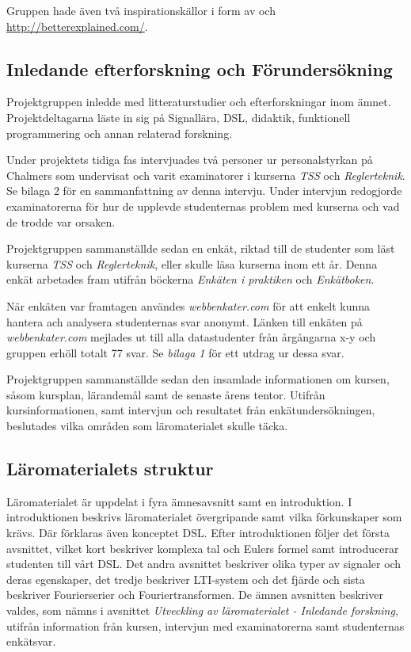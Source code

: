 \documentclass[]{article}
\begin{document}
Gruppen hade även två inspirationskällor i form av \cite{learnyouahaskell} och \url{http://betterexplained.com/}.


\subsection{Inledande efterforskning och Förundersökning}

Projektgruppen inledde med litteraturstudier och efterforskningar inom ämnet. Projektdeltagarna läste in sig på
Signallära, DSL, didaktik, funktionell programmering och annan relaterad forskning.

Under projektets tidiga fas intervjuades två personer ur personalstyrkan på Chalmers som undervisat och varit
examinatorer i kurserna \textit{TSS} och \textit{Reglerteknik}. Se {bilaga 2} för en sammanfattning av denna intervju.
Under intervjun redogjorde examinatorerna för hur de upplevde studenternas problem med kurserna och vad de trodde var
orsaken.

Projektgruppen sammanställde sedan en enkät, riktad till de studenter som läst kurserna \textit{TSS} och
\textit{Reglerteknik}, eller skulle läsa kurserna inom ett år. Denna enkät arbetades fram utifrån böckerna
\textit{Enkäten i praktiken} och \textit{Enkätboken}.

När enkäten var framtagen användes \textit{webbenkater.com} för att enkelt kunna hantera ach analysera studenternas svar
anonymt. Länken till enkäten på \textit{webbenkater.com} mejlades ut till alla datastudenter från årgångarna x-y och
gruppen erhöll totalt 77 svar.  Se \textit{bilaga 1} för ett utdrag ur dessa svar.

Projektgruppen sammanställde sedan den insamlade informationen om kursen, såsom kursplan, lärandemål samt de senaste
årens tentor. Utifrån kursinformationen, samt intervjun och resultatet från enkätundersökningen, beslutades vilka
områden som läromaterialet skulle täcka.


\subsection{Läromaterialets struktur}

Läromaterialet är uppdelat i fyra ämnesavsnitt samt en introduktion. I introduktionen beskrivs läromaterialet
övergripande samt vilka förkunskaper som krävs. Där förklaras även konceptet DSL. Efter introduktionen följer det
första avsnittet, vilket kort beskriver komplexa tal och Eulers formel samt introducerar studenten till vårt DSL. Det
andra avsnittet beskriver olika typer av signaler och deras egenskaper, det tredje beskriver LTI-system och det fjärde
och sista beskriver Fourierserier och Fouriertransformen. De ämnen avsnitten beskriver valdes, som nämns i avsnittet
\textit{Utveckling av läromaterialet - Inledande forskning}, utifrån information från kursen, intervjun med
examinatorerna samt studenternas enkätsvar.
\end{document}

